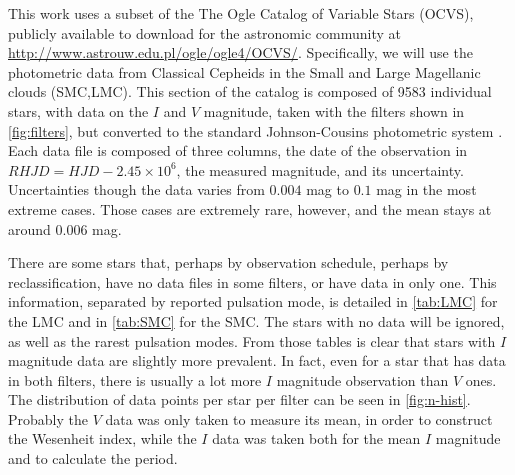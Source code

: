 
This work uses a subset of the The Ogle Catalog of Variable Stars (OCVS), publicly available to download for the 
astronomic community at \url{http://www.astrouw.edu.pl/ogle/ogle4/OCVS/}.
Specifically, we will use the photometric data from Classical Cepheids in the Small and Large Magellanic clouds (SMC,LMC).
This section of the catalog is composed of 9583 individual stars, with data on the $I$ and $V$ magnitude, 
taken with the filters shown in \autoref{fig:filters}, but converted to the standard Johnson-Cousins photometric system \citep{OGLE2015}.
Each data file is composed of three columns, the date of the observation in $RHJD=HJD-2.45\times 10^6$, 
the measured magnitude, and its uncertainty. 
Uncertainties though the data varies from $0.004$ mag to $0.1$ mag in the most extreme cases. 
Those cases are extremely rare, however, and the mean stays at around $0.006$ mag.


There are some stars that, perhaps by observation schedule, perhaps by reclassification, have no data files in some filters, or have data in only one.
This information, separated by reported pulsation mode, is detailed in \autoref{tab:LMC} for the LMC and in \autoref{tab:SMC} for the SMC.
The stars with no data will be ignored, as well as the rarest pulsation modes.
From those tables is clear that stars with $I$ magnitude data are slightly more prevalent.
In fact, even for a star that has data in both filters, there is usually a lot more $I$ magnitude observation than $V$ ones.
The distribution of data points per star per filter can be seen in \autoref{fig:n-hist}.
Probably the $V$ data was only taken to measure its mean, in order to construct the Wesenheit index,
while the $I$ data was taken both for the mean $I$ magnitude and to calculate the period.

